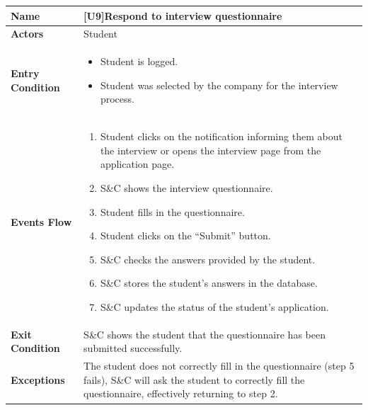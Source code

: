 \begin{center}
    \begin{tabular}{|p{9em}|p{27em}|}
        \hline
        \rowcolor{bluepoli!40} %
        \textbf{Name} & \textbf{[U9]Respond to interview questionnaire} \\
        \hline
        \textbf{Actors} & Student\\
        \hline
        \textbf{Entry Condition} & 
        \begin{itemize}
            \item Student is logged.
            \item Student was selected by the company for the interview process.
        \end{itemize} \\
        \hline
        \textbf{Events Flow} & 
        \begin{enumerate}
            \item Student clicks on the notification informing them about the interview or opens the interview page from the application page.
            \item S\&C shows the interview questionnaire.
            \item Student fills in the questionnaire.
            \item Student clicks on the ``Submit'' button.
            \item S\&C checks the answers provided by the student.
            \item S\&C stores the student's answers in the database.
            \item S\&C updates the status of the student's application.
        \end{enumerate} \\
        \hline
        \textbf{Exit Condition} & S\&C shows the student that the questionnaire has been submitted successfully.\\
        \hline
        \textbf{Exceptions} & The student does not correctly fill in the questionnaire (step 5 fails), S\&C will ask the student to correctly
        fill the questionnaire, effectively returning to step 2.\\
        \hline
    \end{tabular}
\end{center}

